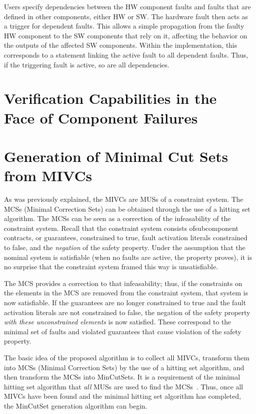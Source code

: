 Users specify dependencies between the HW component faults and faults that are defined in other components, either HW or SW. The hardware fault then acts as a trigger for dependent faults. This allows a simple propagation from the faulty HW component to the SW components that rely on it, affecting the behavior on the outputs of the affected SW components. Within the implementation, this corresponds to a statement linking the active fault to all dependent faults. Thus, if the triggering fault is active, so are all dependencies.

\section{Verification Capabilities in the Face of Component Failures}


\section{Generation of Minimal Cut Sets from MIVCs}
As was previously explained, the MIVCs are MUSs of a constraint system. The MCSs (Minimal Correction Sets) can be obtained through the use of a hitting set algorithm. The MCSs can be seen as a correction of the infeasability of the constraint system. Recall that the constraint system consists ofsubcomponent contracts, or guarantees, constrained to true, fault activation literals constrained to false, and the \textit{negation} of the safety property. Under the assumption that the nominal system is satisfiable (when no faults are active, the property proves), it is no surprise that the constraint system framed this way is unsatisfiable. 

The MCS provides a correction to that infeasability; thus, if the constraints on the elements in the MCS are removed from the constraint system, that system is now satisfiable. If the guarantees are no longer constrained to true and the fault activation literals are not constrained to false, the negation of the safety property \textit{with these unconstrained elements} is now satisfied. These correspond to the minimal set of faults and violated guarantees that cause violation of the safety property. 

The basic idea of the proposed algorithm is to collect all MIVCs, transform them into MCSs (Minimal Correction Sets) by the use of a hitting set algorithm, and then transform the MCSs into MinCutSets. It is a requirement of the minimal hitting set algorithm that \textit{all} MUSs are used to find the MCSs~\cite{liffiton2016fast,gainer2017minimal,murakami2013efficient}. Thus, once all MIVCs have been found and the minimal hitting set algorithm has completed, the MinCutSet generation algorithm can begin. 

